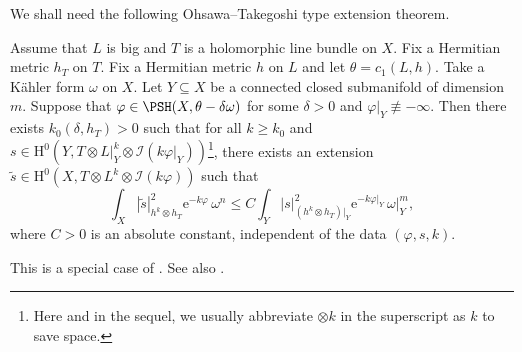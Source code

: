 We shall need the following Ohsawa--Takegoshi type extension theorem.
\begin{theorem}\label{thm:OT_ext} Assume that $L$ is big and $T$ is a holomorphic line bundle on $X$. Fix a Hermitian metric $h_T$ on $T$.
Fix a Hermitian metric $h$ on $L$ and let $\theta=c_1(L,h)$.
Take a Kähler form $\omega$ on $X$. Let $Y\subseteq X$ be a connected closed submanifold of dimension $m$.
Suppose that $\varphi \in \PSH(X,\theta - \delta \omega)$ for some $\delta>0$ and $\varphi|_Y\not\equiv -\infty$.
Then there exists $k_0(\delta,h_T)>0$ such that for all $k \geq k_0$ and $s \in \mathrm{H}^0(Y, T\otimes L|_Y^k \otimes \mathcal{I}(k\varphi|_Y))$\footnote{Here and in the sequel, we usually abbreviate $\otimes k$ in the superscript as $k$ to save space.}, there exists an extension $\tilde s \in \mathrm{H}^0(X, T\otimes L^k \otimes \mathcal{I}(k\varphi))$ such that
\[
\int_X |\tilde{s}|^2_{h^k\otimes h_T}\mathrm{e}^{-k\varphi}\,\omega^n \leq C \int_Y |s|^2_{(h^k\otimes h_T)|_Y} \mathrm{e}^{-k\varphi|_Y}\,\omega|_Y^m,
\]
where $C>0$ is an absolute constant, independent of the data $(\varphi,s,k)$.
\end{theorem}
This is a special case of \cite[Theorem~1.4]{His12}. See also \cite[Corollary~14.7.9]{FPT}.


